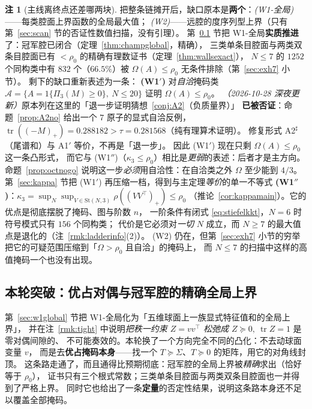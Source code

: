 \documentclass[UTF8,11pt]{ctexart}
\theoremstyle{definition}
\newtheorem{remark}[theorem]{注}
\newcommand{\tr}{\operatorname{tr}}
\begin{document}
\begin{remark}[主线离终点还差哪两块]\label{rmk:gaps}
把整条链摊开后，缺口原本是\textbf{两个}：\emph{(W1-全局)}——每类腔面上界函数的全局最大值；
\emph{(W2)}——远腔的度序列型上界（只有第~\ref{sec:scan} 节的否证性数值扫描，没有引理）。
第~\ref{sec:domdual} 节把 W1-全局\textbf{实质推进}了：冠军腔已闭合（定理~\ref{thm:champglobal}，精确），
三类单条目腔面与两类双条目腔面已有 $<\rho_0$ 的精确有理数证书（定理~\ref{thm:wallsexact}），
$N\le7$ 的 $1252$ 个同构类中有 $832$ 个（$66.5\%$）被 $\Omega(A)\le\rho_0$ 无条件排除（第~\ref{sec:exh7} 小节）。
剩下的缺口重新表述为一条：
\textbf{(W1$'$)} 对\emph{自洽}掩码类 $\mathcal A=\{A=1\{\Pi_3(M)\ge0\},\ N\le20\}$ 证明
$\Omega(A)\le\rho_0$。
\emph{（2026-10-28 深夜更新）}原本列在这里的「退一步证明猜想~\ref{conj:A2}（负质量界）」
\textbf{已被否证}：命题~\ref{prop:A2no} 给出一个 $7$ 原子的显式自洽反例，
$\tr((-M)_+)=0.288182>\tau=0.281568$（纯有理算术证明）。
修复形式 A2$^\sharp$（尾谱和）与 A1$'$ 等价，不再是「退一步」。
因此 (W1$'$) 现在只剩 $\Omega(A)\le\rho_0$ 这一条凸形式，
而它与 (W1$''$)（$\kappa_3\le\rho_0$）相比是\emph{更弱}的表述：后者才是主方向。
命题~\ref{prop:octnogo} 说明这一步\emph{必须}用自洽性：在自洽类之外 $\Omega$ 至少能到 $4/3$。
第~\ref{sec:kappa} 节把 (W1$'$) 再压缩一档，得到与主定理\emph{等价}的单一不等式
\textbf{(W1$''$)}：$\kappa_3=\sup_{N}\sup_{V\in\mathrm{St}(N,3)}\rho((VV^\top)_+)\le\rho_0$
（推论~\ref{cor:kappamain}）。它的优点是彻底摆脱了掩码、图与阶数 $n$，
一阶条件有闭式 \eqref{eq:stiefelkkt}，$N=6$ 时符号模式只有 $156$ 个同构类；
代价是它必须对\emph{一切} $N$ 成立，而 $N\ge7$ 的最大值点是退化的（注~\ref{rmk:ladderinfo}(2)）。
(W2) 仍在，但第~\ref{sec:exh7} 小节的穷举把它的可疑范围压缩到「$\Omega>\rho_0$ 且自洽」的掩码上，
而 $N\le7$ 的扫描中这样的高值掩码一个也没有出现。
\end{remark}

\subsection{本轮突破：优占对偶与冠军腔的精确全局上界}\label{sec:domdual}

第~\ref{sec:w1global} 节把 W1-全局化为「五维球面上一族显式特征值和的全局上界」，
并在注~\ref{rmk:tight} 中说明\emph{把秩一约束 $Z=vv^\top$ 松弛成 $Z\succeq0,\ \tr Z=1$} 是零对偶间隙的、
不可能奏效的。本轮换了一个方向完全不同的凸化：不去动球面变量 $v$，
而是去\textbf{优占掩码本身}——找一个 $T\succeq\Sigma$、$T\succeq0$ 的矩阵，用它的对角线封顶。
这条路走通了，而且通得比预期彻底：冠军腔的全局上界被\emph{精确}求出（恰好等于 $\rho_0$），
证书只有三个根式常数；三类单条目腔面与两类双条目腔面也一并得到了严格上界。
同时它也给出了一条\textbf{定量}的否定性结果，说明这条路本身还不足以覆盖全部掩码。
\end{document}

